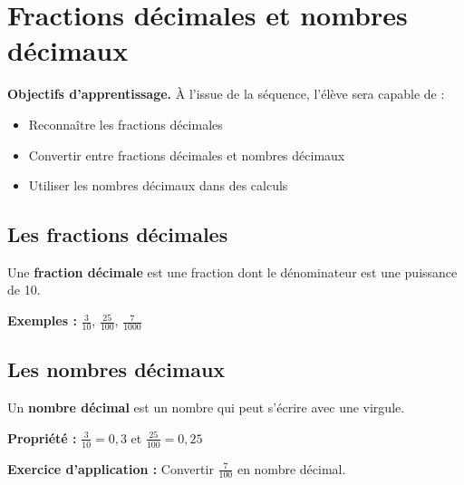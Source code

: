 \chapter{Fractions décimales et nombres décimaux}

\begin{objectifsbox}
\textbf{Objectifs d'apprentissage.} À l'issue de la séquence, l'élève sera capable de :
\begin{itemize}
\item Reconnaître les fractions décimales
\item Convertir entre fractions décimales et nombres décimaux
\item Utiliser les nombres décimaux dans des calculs
\end{itemize}
\end{objectifsbox}

\section{Les fractions décimales}

\begin{definitionbox}
Une \textbf{fraction décimale} est une fraction dont le dénominateur est une puissance de 10.
\end{definitionbox}

\begin{examplebox}
\textbf{Exemples :} $\frac{3}{10}$, $\frac{25}{100}$, $\frac{7}{1000}$
\end{examplebox}

\section{Les nombres décimaux}

\begin{definitionbox}
Un \textbf{nombre décimal} est un nombre qui peut s'écrire avec une virgule.
\end{definitionbox}

\begin{proprietebox}
\textbf{Propriété :} $\frac{3}{10} = 0,3$ et $\frac{25}{100} = 0,25$
\end{proprietebox}

\begin{exercisebox}
\textbf{Exercice d'application :}
Convertir $\frac{7}{100}$ en nombre décimal.
\end{exercisebox}
